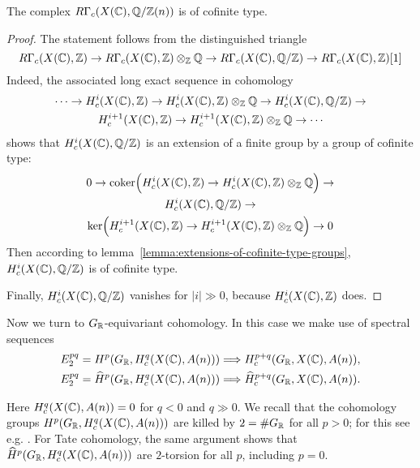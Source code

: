 \documentclass{article}
\numberwithin{equation}{section}
\begin{document}
\begin{lemma}
  The complex $R\Gamma_c (X (\mathbb{C}), \mathbb{Q}/\mathbb{Z} (n))$ is of cofinite type.

  \begin{proof}
    The statement follows from the distinguished triangle
    \[ R\Gamma_c (X (\mathbb{C}), \mathbb{Z}) \to
    R\Gamma_c (X (\mathbb{C}), \mathbb{Z})\otimes_{\mathbb{Z}} \mathbb{Q} \to
    R\Gamma_c (X (\mathbb{C}), \mathbb{Q}/\mathbb{Z}) \to
    R\Gamma_c (X (\mathbb{C}), \mathbb{Z}) [1] \]
    Indeed, the associated long exact sequence in cohomology
    \begin{multline*}
      \cdots \to H^i_c (X (\mathbb{C}), \mathbb{Z}) \to
      H^i_c (X (\mathbb{C}), \mathbb{Z})\otimes_{\mathbb{Z}} \mathbb{Q} \to
      H^i_c (X (\mathbb{C}), \mathbb{Q}/\mathbb{Z}) \to\\
      H^{i+1}_c (X (\mathbb{C}), \mathbb{Z}) \to
      H^{i+1}_c (X (\mathbb{C}), \mathbb{Z})\otimes_{\mathbb{Z}} \mathbb{Q} \to \cdots
    \end{multline*}
    shows that $H^i_c (X (\mathbb{C}), \mathbb{Q}/\mathbb{Z})$ is an extension of a finite group by a
    group of cofinite type:
    \begin{multline*}
      0 \to \operatorname{coker} \Bigl(H^i_c (X (\mathbb{C}), \mathbb{Z}) \to
      H^i_c (X (\mathbb{C}), \mathbb{Z})\otimes_{\mathbb{Z}} \mathbb{Q}\Bigr) \to\\
      H^i_c (X (\mathbb{C}), \mathbb{Q}/\mathbb{Z}) \to\\
      \ker \Bigl(H^{i+1}_c (X (\mathbb{C}), \mathbb{Z}) \to
      H^{i+1}_c (X (\mathbb{C}), \mathbb{Z})\otimes_{\mathbb{Z}} \mathbb{Q}\Bigr) \to 0
    \end{multline*}
    Then according to lemma~\ref{lemma:extensions-of-cofinite-type-groups},
    $H^i_c (X (\mathbb{C}), \mathbb{Q}/\mathbb{Z})$ is of cofinite type.

    Finally, $H^i_c (X (\mathbb{C}), \mathbb{Q}/\mathbb{Z})$ vanishes for $|i| \gg 0$, because
    $H^i_c (X (\mathbb{C}), \mathbb{Z})$ does.
  \end{proof}
\end{lemma}

Now we turn to $G_{\mathbb{R}}$-equivariant cohomology. In this case we make use of
spectral sequences
\begin{align*}
  E_2^{pq} = H^p (G_{\mathbb{R}}, H_c^q (X (\mathbb{C}), A (n))) & \Longrightarrow H_c^{p+q} (G_{\mathbb{R}}, X (\mathbb{C}), A (n)), \\
  E_2^{pq} = \widehat{H}^p (G_{\mathbb{R}}, H_c^q (X (\mathbb{C}), A (n))) & \Longrightarrow \widehat{H}_c^{p+q} (G_{\mathbb{R}}, X (\mathbb{C}), A (n)).
\end{align*}

Here $H_c^q (X (\mathbb{C}), A (n)) = 0$ for $q < 0$ and $q \gg 0$. We recall that the
cohomology groups $H^p (G_{\mathbb{R}}, H_c^q (X (\mathbb{C}), A (n)))$ are killed by
$2 = \# G_{\mathbb{R}}$ for all $p > 0$; for this see e.g.
\cite[Theorem~6.5.8]{Weibel-1994}. For Tate cohomology, the same argument shows
that $\widehat{H}^p (G_{\mathbb{R}}, H_c^q (X (\mathbb{C}), A (n)))$ are $2$-torsion for all
$p$, including $p = 0$.
\end{document}
